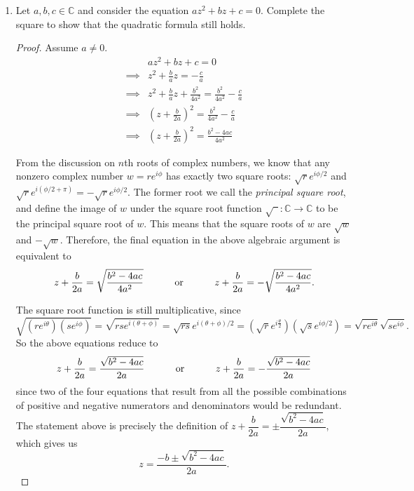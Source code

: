 \documentclass[10pt]{article}
\newcommand{\C}{\mathbb{C}}
\begin{document}
\begin{enumerate}
\begin{proof}
The Taylor series for $f(x)$ centered at $0$ is the $0$ function, since $f^{(n)}(0) = 0$ for all nonnegative integers $n$.  Although this Taylor series has an infinite radius of convergence, it does not equal $f$.
\end{proof}

\item Let $a,b,c \in \C$ and consider the equation $az^2 + bz + c = 0$.  Complete the square to show that the quadratic formula still holds.

\begin{proof}
Assume $a \neq 0$.
\begin{align*}
& az^2 + bz + c = 0
\\ \implies
& z^2 + \frac{b}{a}z = -\frac{c}{a}
\\ \implies
& z^2 + \frac{b}{a}z + \frac{b^2}{4a^2} = \frac{b^2}{4a^2} - \frac{c}{a}
\\ \implies
& \left( z+\frac{b}{2a} \right)^2 = \frac{b^2}{4a^2} - \frac{c}{a}
\\ \implies
& \left( z+\frac{b}{2a} \right)^2 = \frac{b^2 - 4ac}{4a^2}
\end{align*}

From the discussion on $n$th roots of complex numbers, we know that any nonzero complex number $w = r e^{i \phi}$ has exactly two square roots: $\sqrt{r} e^{i \phi / 2}$ and $\sqrt{r} e^{i(\phi / 2 + \pi)} = -\sqrt{r} e^{i\phi / 2}$.  The former root we call the \emph{principal square root}, and define the image of $w$ under the square root function $\sqrt{\phantom{z}}: \C \rightarrow \C$ to be the principal square root of $w$.  This means that the square roots of $w$ are $\sqrt{w}$ and $-\sqrt{w}$.  Therefore, the final equation in the above algebraic argument is equivalent to
$$
z+\frac{b}{2a} = \sqrt{\frac{b^2 - 4ac}{4a^2}} \text{\hspace{1cm} or \hspace{1cm}} z+\frac{b}{2a} = -\sqrt{\frac{b^2 - 4ac}{4a^2}}.
$$

The square root function is still multiplicative, since
$$
\sqrt{(re^{i\theta})(se^{i\phi})} = \sqrt{rs e^{i(\theta + \phi)}} = \sqrt{rs}e^{i(\theta + \phi) / 2} = (\sqrt{r}e^{i\frac{\theta}{2}})( \sqrt{s} e^{i \phi / 2}) = \sqrt{re^{i\theta}} \sqrt{s e^{i\phi}}.
$$
So the above equations reduce to
$$
z+\frac{b}{2a} = \frac{\sqrt{b^2 - 4ac}}{2a} \text{\hspace{1cm} or \hspace{1cm}} z+\frac{b}{2a} = -\frac{\sqrt{b^2 - 4ac}}{2a}
$$
since two of the four equations that result from all the possible combinations of positive and negative numerators and denominators would be redundant.  The statement above is precisely the definition of $z+\dfrac{b}{2a} = \pm \dfrac{\sqrt{b^2 - 4ac}}{2a}$, which gives us
$$
z = \frac{-b \pm \sqrt{b^2 - 4ac}}{2a}.
$$
\end{proof}


\end{enumerate}
\end{document}

